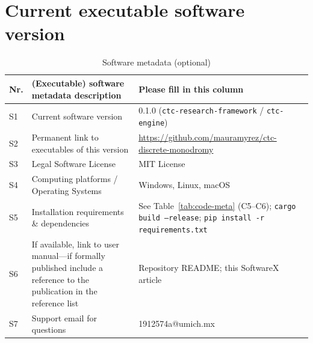 \documentclass[preprint,12pt,a4paper]{elsarticle}
\begin{document}

\section*{Current executable software version}
\label{sec:soft-version}

\begin{table}[H]
\small
\begin{tabular}{|l|p{5.2cm}|p{6.8cm}|}
\hline
\textbf{Nr.} & \textbf{(Executable) software metadata description} & \textbf{Please fill in this column} \\
\hline
S1 & Current software version & 0.1.0 (\texttt{ctc-research-framework} / \texttt{ctc-engine}) \\
\hline
S2 & Permanent link to executables of this version & \url{https://github.com/mauramyrez/ctc-discrete-monodromy} \\
\hline
S3 & Legal Software License & MIT License \\
\hline
S4 & Computing platforms / Operating Systems & Windows, Linux, macOS \\
\hline
S5 & Installation requirements \& dependencies & See Table~\ref{tab:code-meta} (C5--C6); \texttt{cargo build --release}; \texttt{pip install -r requirements.txt} \\
\hline
S6 & If available, link to user manual---if formally published include a reference to the publication in the reference list & Repository README; this SoftwareX article \\
\hline
S7 & Support email for questions & 1912574a@umich.mx \\
\hline
\end{tabular}
\caption{Software metadata (optional)}
\label{tab:soft-meta}
\end{table}
\end{document}
